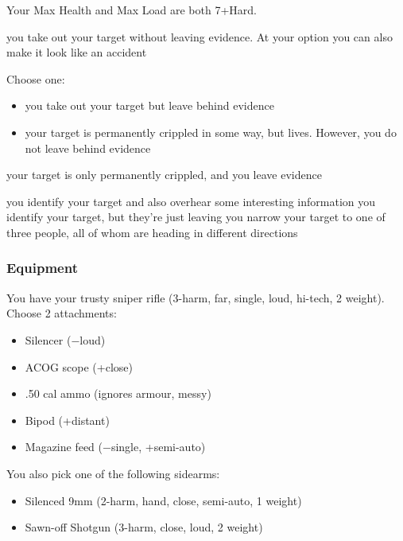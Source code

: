 Your Max Health and Max Load are both 7+Hard.

{you take out your target without leaving evidence. At your option you can also make it look like an accident}
{Choose one:
\begin{itemize}
\item you take out your target but leave behind evidence
\item your target is permanently crippled in some way, but lives. However, you do not leave behind evidence
\end{itemize}}
{your target is only permanently crippled, and you leave evidence}

{you identify your target and also overhear some interesting information}
{you identify your target, but they're just leaving}
{you narrow your target to one of three people, all of whom are heading in different directions}


\subsubsection{Equipment}

You have your trusty sniper rifle (3-harm, far, single, loud, hi-tech, 2 weight). Choose 2 attachments:
\begin{itemize}
\item Silencer ($-$loud)
\item ACOG scope (+close)
\item .50 cal ammo (ignores armour, messy)
\item Bipod (+distant)
\item Magazine feed ($-$single, +semi-auto)
\end{itemize}

You also pick one of the following sidearms:
\begin{itemize}
\item Silenced 9mm (2-harm, hand, close, semi-auto, 1 weight)
\item Sawn-off Shotgun (3-harm, close, loud, 2 weight)
\end{itemize}

